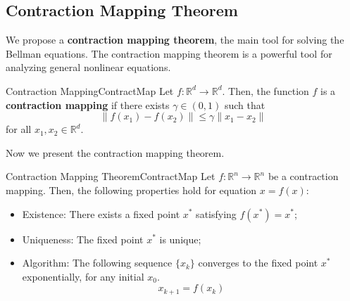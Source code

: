     \subsection{Contraction Mapping Theorem}
        We propose a \textbf{contraction mapping theorem}, the main tool for solving the Bellman equations.
        The contraction mapping theorem is a powerful tool for analyzing general nonlinear equations.
        \begin{defn}{Contraction Mapping}{ContractMap}
            Let $f : \mathbb{R}^d \to \mathbb{R}^d$. Then, the function $f$ is a \textbf{contraction mapping}
            if there exists $\gamma \in (0,1)$ such that
            \begin{equation}
                \|f(x_1) - f(x_2)\| \leq \gamma \|x_1-x_2\|
            \end{equation}
            for all $x_1,x_2 \in \mathbb{R}^d$.
        \end{defn}
        Now we present the contraction mapping theorem.
        \begin{thm}{Contraction Mapping Theorem}{ContractMap}
            Let $f:\mathbb{R}^n \to \mathbb{R}^n$ be a contraction mapping. Then, the following properties hold for equation $x=f(x)$:
            \begin{itemize}
                \item Existence: There exists a fixed point $x^*$ satisfying $f(x^*)=x^*$;
                \item Uniqueness: The fixed point $x^*$ is unique;
                \item Algorithm: The following sequence $\{x_k\}$ converges to the fixed point $x^*$ exponentially, for any initial $x_0$.
                    \begin{equation}
                        x_{k+1} = f(x_k)
                    \end{equation}
            \end{itemize}
        \end{thm}
